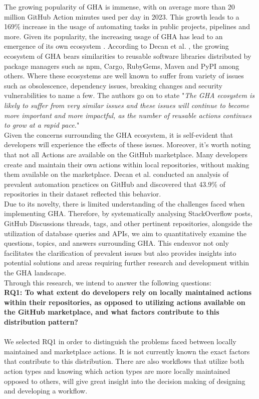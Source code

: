 \documentclass[conference]{IEEEtran}
\begin{document}
    The growing popularity of GHA is immense, with on average more than 20 million GitHub Action minutes used per day in 2023. This growth leads to a 169\% increase in the usage of automating tasks in public projects,  pipelines and more\cite{github2023octoverse}. Given its popularity,  the increasing usage of GHA has lead to an emergence of its own ecosystem \cite{decan2022use}.  According to Decan et al. \cite{decan2022use}, the growing ecosystem of GHA bears similarities to reusable software libraries distributed by package managers such as npm, Cargo, RubyGems, Maven and PyPI among others. Where these ecosystems are well known to suffer from variety of issues such as obsolescence, dependency issues, breaking changes and security vulnerabilities to name a few\cite{decan2022use}. The authors go on to state "\textit{The GHA ecosystem is likely to suffer from very similar issues and these issues will continue to become more important and more impactful, as the number of reusable actions continues to grow at a rapid pace.}"\\

    Given the concerns surrounding the GHA ecosystem, it is self-evident that developers will experience the effects of these issues.  Moreover, it's worth noting that not all Actions are available on the GitHub marketplace. Many developers create and maintain their own actions within local repositories, without making them available on the marketplace. Decan et al. \cite{decan2022use} conducted an analysis of prevalent automation practices on GitHub and discovered that 43.9\% of repositories in their dataset reflected this behavior.\\

    Due to its novelty, there is limited understanding of the challenges faced when implementing GHA.  
Therefore,  by systematically analysing StackOverflow posts, GitHub Discussions threads, tags, and other pertinent repositories, alongside the utilization of database queries and APIs, we aim to quantitatively examine the questions, topics, and answers surrounding GHA. This endeavor not only facilitates the clarification of prevalent issues but also provides insights into potential solutions and areas requiring further research and development within the GHA landscape.\\

Through this research, we intend to answer the following questions:
\\


     \textbf{RQ1: To what extent do developers rely on locally maintained actions within their repositories, as opposed to utilizing actions available on the GitHub marketplace, and what factors contribute to this distribution pattern?}
\\
\\
We selected RQ1 in order to distinguish the problems faced between locally maintained and marketplace actions. It is not currently known the exact factors that contribute to this distribution. There are also workflows that utilize both action types and knowing which action types are more locally maintained opposed to others, will give great insight into the decision making of designing and developing a workflow. \\
\end{document}
